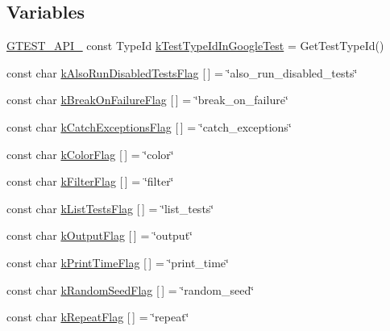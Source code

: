 \subsection*{\-Variables}
\begin{DoxyCompactItemize}
\item 
\hyperlink{gtest-port_8h_aa73be6f0ba4a7456180a94904ce17790}{\-G\-T\-E\-S\-T\-\_\-\-A\-P\-I\-\_\-} const \-Type\-Id \hyperlink{namespacetesting_1_1internal_a3117ae1f8725f2828385dd7d9fb91ffc}{k\-Test\-Type\-Id\-In\-Google\-Test} = \-Get\-Test\-Type\-Id()
\item 
const char \hyperlink{namespacetesting_1_1internal_a6ede7eecc363c348aba14d8b41f73b8f}{k\-Also\-Run\-Disabled\-Tests\-Flag} \mbox{[}$\,$\mbox{]} = \char`\"{}also\-\_\-run\-\_\-disabled\-\_\-tests\char`\"{}
\item 
const char \hyperlink{namespacetesting_1_1internal_a7428ba6fee0b44acbd1d308cd7804beb}{k\-Break\-On\-Failure\-Flag} \mbox{[}$\,$\mbox{]} = \char`\"{}break\-\_\-on\-\_\-failure\char`\"{}
\item 
const char \hyperlink{namespacetesting_1_1internal_a1a9e7362cafa5838b6cae9fb1a861ada}{k\-Catch\-Exceptions\-Flag} \mbox{[}$\,$\mbox{]} = \char`\"{}catch\-\_\-exceptions\char`\"{}
\item 
const char \hyperlink{namespacetesting_1_1internal_a0794d62b77bae59a9082ba4b7ea1fc90}{k\-Color\-Flag} \mbox{[}$\,$\mbox{]} = \char`\"{}color\char`\"{}
\item 
const char \hyperlink{namespacetesting_1_1internal_ae8ede5b14ce6f96fff7e0aabe86aceef}{k\-Filter\-Flag} \mbox{[}$\,$\mbox{]} = \char`\"{}filter\char`\"{}
\item 
const char \hyperlink{namespacetesting_1_1internal_ae3a6eeb3de16a5f69f3bc0568c8e9da0}{k\-List\-Tests\-Flag} \mbox{[}$\,$\mbox{]} = \char`\"{}list\-\_\-tests\char`\"{}
\item 
const char \hyperlink{namespacetesting_1_1internal_add148191334fbc797c9a2cc2fff82670}{k\-Output\-Flag} \mbox{[}$\,$\mbox{]} = \char`\"{}output\char`\"{}
\item 
const char \hyperlink{namespacetesting_1_1internal_a75c069f656d8436272be49ad7024bb1b}{k\-Print\-Time\-Flag} \mbox{[}$\,$\mbox{]} = \char`\"{}print\-\_\-time\char`\"{}
\item 
const char \hyperlink{namespacetesting_1_1internal_aa59cb88e76f5f3649a22dd1c32666671}{k\-Random\-Seed\-Flag} \mbox{[}$\,$\mbox{]} = \char`\"{}random\-\_\-seed\char`\"{}
\item 
const char \hyperlink{namespacetesting_1_1internal_a16c8fa0cc0f7bae57e88cfcbdf46cd57}{k\-Repeat\-Flag} \mbox{[}$\,$\mbox{]} = \char`\"{}repeat\char`\"{}

\end{DoxyCompactItemize}
